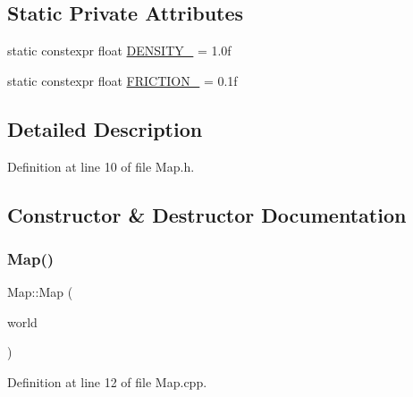 \subsection*{Static Private Attributes}
\begin{DoxyCompactItemize}
\item 
static constexpr float \hyperlink{classMap_a011ca799401c6fa3fa115ee223412a8c}{D\+E\+N\+S\+I\+T\+Y\+\_\+} = 1.\+0f
\item 
static constexpr float \hyperlink{classMap_a16f21d5c0bb1ecd14d5d1ac20df1e101}{F\+R\+I\+C\+T\+I\+O\+N\+\_\+} = 0.\+1f
\end{DoxyCompactItemize}


\subsection{Detailed Description}


Definition at line 10 of file Map.\+h.



\subsection{Constructor \& Destructor Documentation}
\mbox{\label{classMap_a8e8ddd7695e925a23af7b25078038f71}} 
\subsubsection{\texorpdfstring{Map()}{Map()}}
{\footnotesize\ttfamily Map\+::\+Map (\begin{DoxyParamCaption}\item[{b2\+World \&}]{world }\end{DoxyParamCaption})}



Definition at line 12 of file Map.\+cpp.


